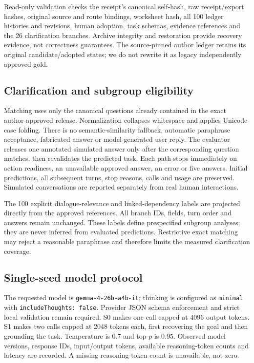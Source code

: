 \documentclass[10pt,conference]{IEEEtran}
\begin{document}
Read-only validation checks the receipt's canonical self-hash, raw receipt/export hashes, original source and route bindings, worksheet hash, all 100 ledger histories and revisions, human adoption, task schemas, evidence references and the 26 clarification branches. Archive integrity and restoration provide recovery evidence, not correctness guarantees. The source-pinned author ledger retains its original candidate/adopted states; we do not rewrite it as legacy independently approved gold.

\subsection{Clarification and subgroup eligibility}
Matching uses only the canonical questions already contained in the exact author-approved release. Normalization collapses whitespace and applies Unicode case folding. There is no semantic-similarity fallback, automatic paraphrase acceptance, fabricated answer or model-generated user reply. The evaluator releases one annotated simulated answer only after the corresponding question matches, then revalidates the predicted task. Each path stops immediately on action readiness, an unavailable approved answer, an error or five answers. Initial predictions, all subsequent turns, stop reasons, calls and usage are preserved. Simulated conversations are reported separately from real human interactions.

The 100 explicit dialogue-relevance and linked-dependency labels are projected directly from the approved references. All branch IDs, fields, turn order and answers remain unchanged. These labels define prespecified subgroup analyses; they are never inferred from evaluated predictions. Restrictive exact matching may reject a reasonable paraphrase and therefore limits the measured clarification coverage.

\subsection{Single-seed model protocol}
The requested model is \texttt{gemma-4-26b-a4b-it}; thinking is configured as \texttt{minimal} with \texttt{includeThoughts: false}. Provider JSON schema enforcement and strict local validation remain required. S0 makes one call capped at 4096 output tokens. S1 makes two calls capped at 2048 tokens each, first recovering the goal and then grounding the task. Temperature is 0.7 and top-$p$ is 0.95. Observed model versions, response IDs, input/output tokens, available reasoning-token counts and latency are recorded. A missing reasoning-token count is unavailable, not zero.
\end{document}
